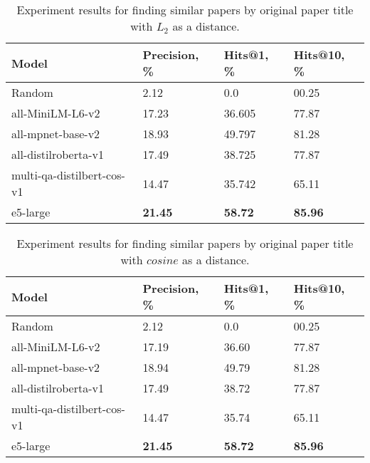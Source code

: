 \begin{table*}
    \small
    \centering
    \caption{Experiment results for finding similar papers by original paper title with \(L_{2}\) as a distance.}
    \bigskip
    \begin{tabularx}{0.99\textwidth}{XIII}

        \toprule

        \bfseries Model & \bfseries Precision, \% & \bfseries Hits@1, \% & \bfseries Hits@10, \% \\

        \midrule
        
        Random		                & 2.12  &  0.0  	   &    00.25 \\
        
        \midrule

        all-MiniLM-L6-v2	        & 17.23 & 36.605	   &	77.87 \\
        all-mpnet-base-v2	        & 18.93 & 49.797	   &	81.28 \\
        all-distilroberta-v1	    & 17.49 & 38.725	   &	77.87 \\
        multi-qa-distilbert-cos-v1	& 14.47 & 35.742	   &	65.11 \\
        e5-large	                & \bfseries 21.45 & \bfseries 58.72 &	\bfseries 85.96 \\

        \bottomrule

    \end{tabularx}

    \label{tab:experiments:title-l2}
\end{table*}

\begin{table}
    \small
    \centering
    \caption{Experiment results for finding similar papers by original paper title with \(cosine\) as a distance.}
    \label{tab:experiments:title-cos}
    \bigskip
    \begin{tabularx}{0.99\textwidth}{XIII}

        \toprule

        \bfseries Model & \bfseries Precision, \% & \bfseries Hits@1, \% & \bfseries Hits@10, \% \\

        \midrule
        
        Random		                & 2.12  &  0.0  &    00.25 \\
        
        \midrule
        
        all-MiniLM-L6-v2	        & 17.19 & 36.60	   &	77.87 \\
        all-mpnet-base-v2	        & 18.94 & 49.79	   &	81.28 \\
        all-distilroberta-v1	    & 17.49 & 38.72	   &	77.87 \\
        multi-qa-distilbert-cos-v1	& 14.47 & 35.74	   &	65.11 \\
        e5-large	                & \bfseries 21.45 & \bfseries 58.72 &	\bfseries 85.96 \\

        \bottomrule

    \end{tabularx}
\end{table}
